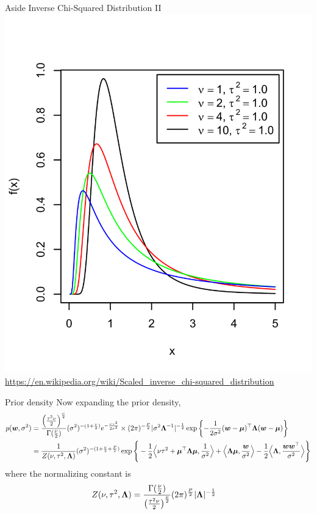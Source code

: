 \documentclass[aspectratio=169]{beamer}
\begin{document}
\begin{frame}{Aside Inverse Chi-Squared Distribution II}
    \centering
    \includegraphics[width=.4\linewidth]{figures/lap1/scaled_inverse_chi_squared.png}
    {\footnotesize \url{https://en.wikipedia.org/wiki/Scaled_inverse_chi-squared_distribution}}
\end{frame}

\begin{frame}{Prior density}
Now expanding the prior density, 
\begin{align}
    p(\boldsymbol{w}, \sigma^2) &= 
    \frac{\left(\frac{\tau^2 \nu}{2} \right)^{\frac{\nu}{2}}}{\Gamma(\frac{\nu}{2})} (\sigma^2)^{-(1 + \frac{\nu}{2})} e^{-\frac{\nu \tau^2}{2\sigma^2}} \times (2\pi)^{-\frac{P}{2}} |\sigma^2 \boldsymbol{\Lambda}^{-1} |^{-\frac{1}{2}} 
    \exp \left \{-\frac{1}{2\sigma^2} (\boldsymbol{w} - \boldsymbol{\mu})^\top \boldsymbol{\Lambda} (\boldsymbol{w} - \boldsymbol{\mu}) \right\} \\
    &= \frac{1}{Z(\nu, \tau^2, \boldsymbol{\Lambda})} (\sigma^2)^{-(1 + \frac{\nu}{2} + \frac{P}{2})} 
    \exp\Bigg\{ 
    -\frac{1}{2} \Big\langle \nu \tau^2 + \boldsymbol{\mu}^\top \boldsymbol{\Lambda} \boldsymbol{\mu}, \frac{1}{\sigma^2} \Big\rangle 
    + \Big\langle \boldsymbol{\Lambda} \boldsymbol{\mu}, \frac{\boldsymbol{w}}{\sigma^2} \Big\rangle 
    -\frac{1}{2} \Big\langle \boldsymbol{\Lambda}, \frac{\boldsymbol{w} \boldsymbol{w}^\top}{\sigma^2} \Big\rangle 
    \Bigg\}
\end{align}
where the normalizing constant is
\begin{align}
    Z(\nu, \tau^2, \boldsymbol{\Lambda}) &= \frac{\Gamma(\frac{\nu}{2})}{\left(\frac{\tau^2 \nu}{2} \right)^{\frac{\nu}{2}}}  (2 \pi)^{\frac{P}{2}} |\boldsymbol{\Lambda}|^{-\frac{1}{2}}
\end{align}
\end{frame}
\end{document}

